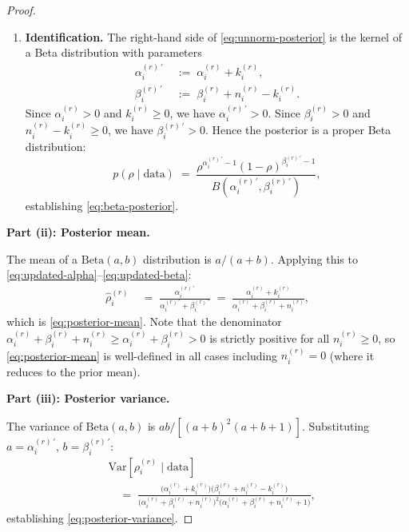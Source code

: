 \documentclass[12pt,openany]{book}
\numberwithin{equation}{chapter}
\theoremstyle{plain}
\theoremstyle{definition}
\theoremstyle{remark}
\numberwithin{equation}{chapter}
\theoremstyle{plain}
\begin{document}
\begin{proof}
\begin{enumerate}
  \item[\textup{(d)}] \textbf{Identification.}
        The right-hand side of \eqref{eq:unnorm-posterior}
        is the kernel of a Beta distribution with parameters
        \begin{align}
          \alpha_i^{(r)\,\prime}
          &\;:=\; \alpha_i^{(r)} + k_i^{(r)},
          \label{eq:updated-alpha}\\[2pt]
          \beta_i^{(r)\,\prime}
          &\;:=\; \beta_i^{(r)} + n_i^{(r)} - k_i^{(r)}.
          \label{eq:updated-beta}
        \end{align}
        Since $\alpha_i^{(r)} > 0$ and $k_i^{(r)} \geq 0$,
        we have $\alpha_i^{(r)\,\prime} > 0$.  Since
        $\beta_i^{(r)} > 0$ and $n_i^{(r)} - k_i^{(r)} \geq 0$,
        we have $\beta_i^{(r)\,\prime} > 0$.  Hence the
        posterior is a proper Beta distribution:
        \begin{equation}
          p\!\left(\rho \mid \mathrm{data}\right)
          \;=\;
          \frac{\rho^{\alpha_i^{(r)\,\prime}-1}
                (1-\rho)^{\beta_i^{(r)\,\prime}-1}}
               {B\!\left(\alpha_i^{(r)\,\prime},
                         \beta_i^{(r)\,\prime}\right)},
          \label{eq:posterior-density}
        \end{equation}
        establishing \eqref{eq:beta-posterior}.
\end{enumerate}

\medskip
\noindent\textbf{Part (ii): Posterior mean.}

The mean of a $\mathrm{Beta}(a,b)$ distribution is $a/(a+b)$.
Applying this to \eqref{eq:updated-alpha}--\eqref{eq:updated-beta}:
\begin{align}
  \hat{\rho}_i^{(r)}
  &\;=\;
  \frac{\alpha_i^{(r)\,\prime}}
       {\alpha_i^{(r)\,\prime} + \beta_i^{(r)\,\prime}}
  \;=\;
  \frac{\alpha_i^{(r)} + k_i^{(r)}}
       {\alpha_i^{(r)} + \beta_i^{(r)} + n_i^{(r)}},
  \label{eq:posterior-mean-proof}
\end{align}
which is \eqref{eq:posterior-mean}.  Note that the denominator
$\alpha_i^{(r)} + \beta_i^{(r)} + n_i^{(r)} \geq
\alpha_i^{(r)} + \beta_i^{(r)} > 0$ is strictly positive
for all $n_i^{(r)} \geq 0$, so \eqref{eq:posterior-mean}
is well-defined in all cases including $n_i^{(r)} = 0$
(where it reduces to the prior mean).

\medskip
\noindent\textbf{Part (iii): Posterior variance.}

The variance of $\mathrm{Beta}(a,b)$ is $ab/[(a+b)^2(a+b+1)]$.
Substituting $a = \alpha_i^{(r)\,\prime}$,
$b = \beta_i^{(r)\,\prime}$:
\begin{align}
  &\mathrm{Var}\!\left[\rho_i^{(r)} \mid \mathrm{data}\right]
  \nonumber\\[4pt]
  &\quad=\;
  \frac{
    \bigl(\alpha_i^{(r)} + k_i^{(r)}\bigr)
    \bigl(\beta_i^{(r)} + n_i^{(r)} - k_i^{(r)}\bigr)
  }{
    \bigl(\alpha_i^{(r)} + \beta_i^{(r)} + n_i^{(r)}\bigr)^{\!2}
    \bigl(\alpha_i^{(r)} + \beta_i^{(r)} + n_i^{(r)} + 1\bigr)
  },
  \label{eq:posterior-variance-proof}
\end{align}
establishing \eqref{eq:posterior-variance}.


\end{proof}
\end{document}
